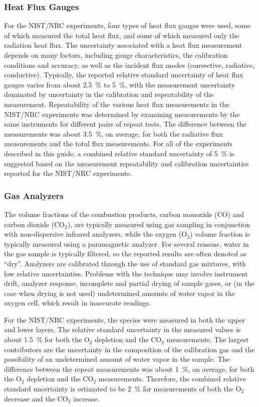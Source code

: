 \subsubsection{Heat Flux Gauges}

For the NIST/NRC experiments, four types of heat flux gauges were used, some of which measured the total heat flux, and some of which measured only the radiation heat flux. The uncertainty associated with a heat flux measurement depends on many factors, including gauge characteristics, the calibration conditions and accuracy, as well as the incident flux modes (convective, radiative, conductive). Typically, the reported relative standard uncertainty of heat flux gauges varies from about 2.5~\% to 5~\%, with the measurement uncertainty dominated by uncertainty in the calibration and repeatability of the measurement. Repeatability of the various heat flux measurements in the NIST/NRC experiments was determined by examining measurements by the same instruments for different pairs of repeat tests. The difference between the measurements was about 3.5~\%, on average, for both the radiative flux measurements and the total flux measurements. For all of the experiments described in this guide, a combined relative standard uncertainty of 5~\% is suggested based on the measurement repeatability and calibration uncertainties reported for the NIST/NRC experiments.

\subsubsection{Gas Analyzers}

The volume fractions of the combustion products, carbon monoxide (CO) and carbon dioxide (CO$_2$), are typically measured using gas sampling in conjunction with non-dispersive infrared analyzers, while the oxygen (O$_2$) volume fraction is typically measured using a paramagnetic analyzer. For several reasons, water in the gas sample is typically filtered, so the reported results are often denoted as ``dry''. Analyzers are calibrated through the use of standard gas mixtures, with low relative uncertainties. Problems with the technique may involve instrument drift, analyzer response, incomplete and partial drying of sample gases, or (in the case when drying is not used) undetermined amounts of water vapor in the oxygen cell, which result in inaccurate readings.

For the NIST/NRC experiments, the species were measured in both the upper and lower layers. The relative standard uncertainty in the measured values is about 1.5~\% for both the O$_2$ depletion and the CO$_2$ measurements. The largest contributors are the uncertainty in the composition of the calibration gas and the possibility of an undetermined amount of water vapor in the sample. The difference between the repeat measurements was about 1~\%, on average, for both the O$_2$ depletion and the CO$_2$ measurements. Therefore, the combined relative standard uncertainty is estimated to be 2~\% for measurements of both the O$_2$ decrease and the CO$_2$ increase.

